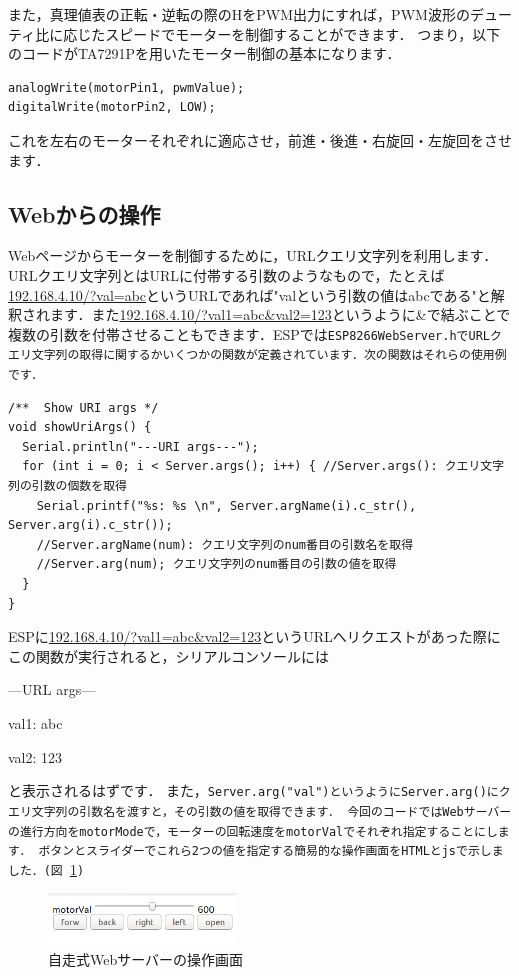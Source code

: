 また，真理値表の正転・逆転の際のHをPWM出力にすれば，PWM波形のデューティ比に応じたスピードでモーターを制御することができます．
つまり，以下のコードがTA7291Pを用いたモーター制御の基本になります．
\begin{verbatim}
analogWrite(motorPin1, pwmValue);
digitalWrite(motorPin2, LOW);
\end{verbatim}
これを左右のモーターそれぞれに適応させ，前進・後進・右旋回・左旋回をさせます．

\subsection{Webからの操作}
Webページからモーターを制御するために，URLクエリ文字列を利用します．URLクエリ文字列とはURLに付帯する引数のようなもので，たとえば\url{192.168.4.10/?val=abc}というURLであれば"valという引数の値はabcである"と解釈されます．また\url{192.168.4.10/?val1=abc&val2=123}というように\&で結ぶことで複数の引数を付帯させることもできます．ESPでは\tt{ESP8266WebServer.h}\rm{}でURLクエリ文字列の取得に関するかいくつかの関数が定義されています．次の関数はそれらの使用例です．
\begin{verbatim}
/**  Show URI args */
void showUriArgs() {
  Serial.println("---URI args---");
  for (int i = 0; i < Server.args(); i++) { //Server.args(): クエリ文字列の引数の個数を取得
    Serial.printf("%s: %s \n", Server.argName(i).c_str(), Server.arg(i).c_str()); 
    //Server.argName(num): クエリ文字列のnum番目の引数名を取得
    //Server.arg(num); クエリ文字列のnum番目の引数の値を取得
  }
}
\end{verbatim}
ESPに\url{192.168.4.10/?val1=abc&val2=123}というURLへリクエストがあった際にこの関数が実行されると，シリアルコンソールには
\tt{

---URL args---

val1: abc

val2: 123

}\rm{}
\noindent
と表示されるはずです．
また，\tt{Server.arg("val")}\rm{}というように\tt{Server.arg()}\rm{}にクエリ文字列の引数名を渡すと，その引数の値を取得できます．
今回のコードではWebサーバーの進行方向をmotorModeで，モーターの回転速度をmotorValでそれぞれ指定することにします．
ボタンとスライダーでこれら2つの値を指定する簡易的な操作画面をHTMLとjsで示しました．(図 \ref{fig:html})

\begin{figure}[htbp]
    \centering
    \includegraphics[width=50mm]{./assets/haibaraaaaaaaasset/motorCtr.png}
    \caption{自走式Webサーバーの操作画面}
    \label{fig:html}
\end{figure}

